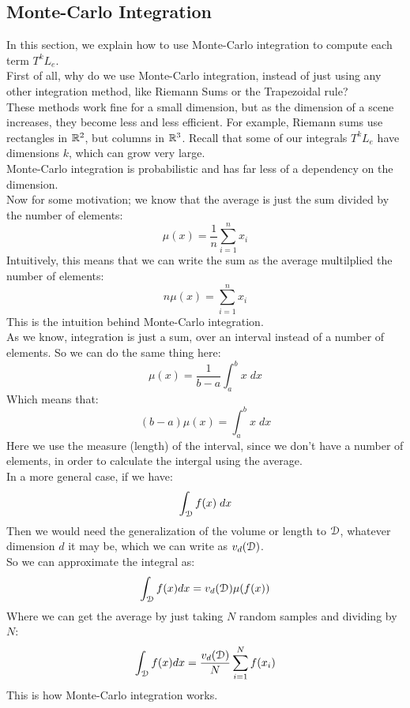 \documentclass[12pt]{article}
\begin{document}
\newpage

\subsection*{Monte-Carlo Integration}

In this section, we explain how to use Monte-Carlo
integration to compute each term $T^kL_e$. \\

First of all, why do we use Monte-Carlo
integration, instead of just using any
other integration method, like Riemann
Sums or the Trapezoidal rule? \\
These methods work fine for a small
dimension, but as the dimension of a scene
increases, they become less and less efficient. 
For example, Riemann sums use rectangles in
$\mathbb{R}^2$, but columns in $\mathbb{R}^3$.
Recall that some of our integrals
$T^kL_e$ have dimensions $k$,
which can grow very large. \\
Monte-Carlo integration is probabilistic
and has far less of a dependency
on the dimension. \\

Now for some motivation;
we know that the average is just the
sum divided by the number of elements:
\[ \mu(x) = \dfrac{1}{n}\sum_{i=1}^n x_i \]
Intuitively, this means that we can write
the sum as the average multilplied the number
of elements:
\[ n\mu(x) = \sum_{i=1}^n x_i \]
This is the intuition behind Monte-Carlo
integration. \\

As we know, integration is just a sum,
over an interval instead of a number of elements.
So we can do the same thing here:
\[ \mu(x) = \dfrac{1}{b-a}\int_a^b x \; dx \]
Which means that:
\[ (b-a)\mu(x) = \int_a^b x \; dx \]
Here we use the measure (length)
of the interval, since we don't have a number
of elements, in order to calculate the intergal
using the average. \\

In a more general case, if we have:
\[ \int_{\mathcal{D}} f(x) \; dx \]
Then we would need the generalization
of the volume or length to $\mathcal{D}$,
whatever dimension $d$ it may be,
which we can write as $v_d(\mathcal{D})$. \\
So we can approximate the integral as:
\[ \int_{\mathcal{D}} f(x) dx
= v_d(\mathcal{D})\mu(f(x)) \]
Where we can get the average by just taking
$N$ random samples and dividing by $N$:
\[ \int_{\mathcal{D}} f(x) dx
= \dfrac{v_d(\mathcal{D})}{N} \sum_{i=1}^N f(x_i) \]
This is how Monte-Carlo integration works. \\
\end{document}
